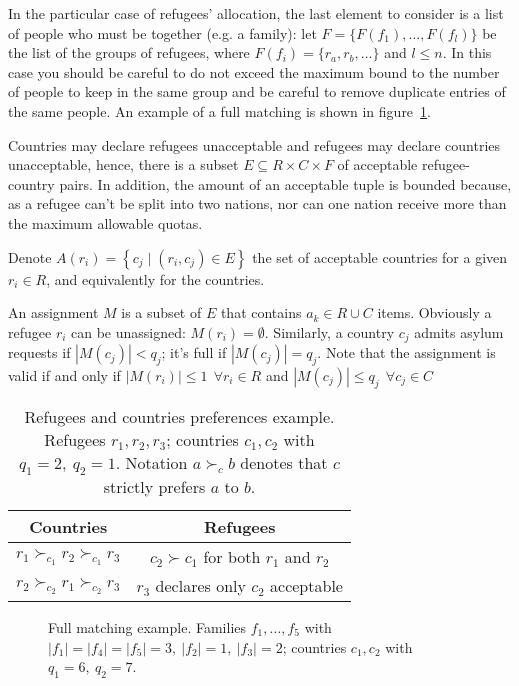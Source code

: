In the particular case of refugees' allocation, the last element to consider is a list of people who must be together (e.g. a family): let \(F=\{F(f_1), \dots, F(f_l)\}\) be the list of the groups of refugees, where \(F(f_i) = \{r_a, r_b, \dots\}\) and \(l \leq n\).
In this case you should be careful to do not exceed the maximum bound to the number of people to keep in the same group and be careful to remove duplicate entries of the same people. An example of a full matching is shown in figure~\ref{fig:complete_matching}.

Countries may declare refugees unacceptable and refugees may declare countries unacceptable, hence, there is a subset \(E \subseteq R \times C \times F\) of acceptable refugee-country pairs.
In addition, the amount of an acceptable tuple is bounded because, as a refugee can't be split into two nations, nor can one nation receive more than the maximum allowable quotas.

Denote \(A \left( r_i \right) = \left\{ c_j \mid \left( r_i, c_j \right) \in E \right\}\) the set of acceptable countries for a given \(r_i \in R\), and equivalently for the countries.

An assignment \(M\) is a subset of \(E\) that contains \(a_k \in R \cup C\) items.
Obviously a refugee \(r_i\) can be unassigned: \(M \left( r_i \right) = \emptyset\).
Similarly, a country \(c_j\) admits asylum requests if \(\left| M \left( c_j \right) \right| < q_j\); it's full if \(\left| M \left( c_j \right) \right| = q_j\).
Note that the assignment is valid if and only if \(\left| M \left( r_i \right) \right| \leq 1\ \ \forall r_i \in R\) and \(\left| M \left( c_j \right) \right| \leq q_j\ \ \forall c_j \in C\)

\begin{table}[!htb]
    \centering
    \begin{tabular}{c|c}
        \hline Countries & Refugees \\
        \hline \(r_1 \succ_{c_1} r_2 \succ_{c_1} r_3\) & \(c_2 \succ c_1\) for both \(r_1\) and \(r_2\) \\
        \(r_2 \succ_{c_2} r_1 \succ_{c_2} r_3\) & \(r_3\) declares only \(c_2\) acceptable \\
        \hline
    \end{tabular}
    \caption{Refugees and countries preferences example. Refugees \(r_1, r_2, r_3\); countries \(c_1, c_2\) with \(q_1 = 2,\ q_2 = 1\). Notation \(a \succ_c b\) denotes that \(c\) strictly prefers \(a\) to \(b\).}
    \label{tab:countries-refugees}
\end{table}

\begin{figure}[!htb]
    \def\svgwidth{\columnwidth}
    
    \caption{Full matching example. Families \(f_1, \dots, f_5\) with \(|f_1|=|f_4|=|f_5|=3,\ |f_2|=1,\ |f_3|=2\); countries \(c_1, c_2\) with \(q_1 = 6,\ q_2 = 7\).}
    \label{fig:complete_matching}
\end{figure}
